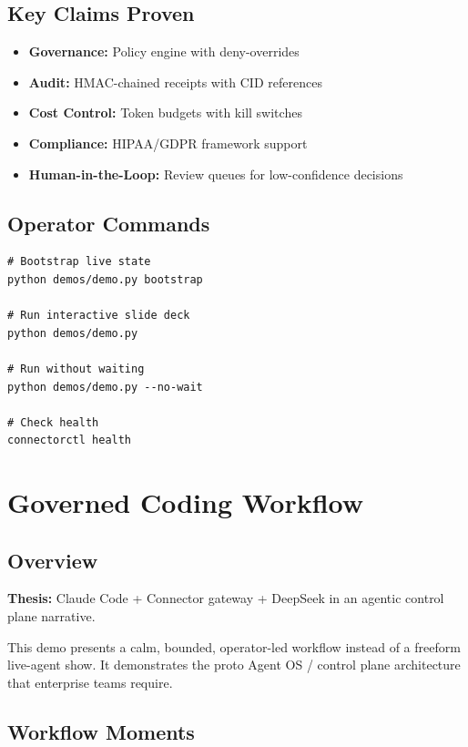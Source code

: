 \documentclass[11pt,a4paper]{article}
\begin{document}
\subsection{Key Claims Proven}

\begin{itemize}
    \item \textbf{Governance:} Policy engine with deny-overrides
    \item \textbf{Audit:} HMAC-chained receipts with CID references
    \item \textbf{Cost Control:} Token budgets with kill switches
    \item \textbf{Compliance:} HIPAA/GDPR framework support
    \item \textbf{Human-in-the-Loop:} Review queues for low-confidence decisions
\end{itemize}

\subsection{Operator Commands}

\begin{lstlisting}
# Bootstrap live state
python demos/demo.py bootstrap

# Run interactive slide deck
python demos/demo.py

# Run without waiting
python demos/demo.py --no-wait

# Check health
connectorctl health
\end{lstlisting}

\newpage

\section{Governed Coding Workflow}

\subsection{Overview}
\textbf{Thesis:} Claude Code + Connector gateway + DeepSeek in an agentic control plane narrative.

This demo presents a calm, bounded, operator-led workflow instead of a freeform live-agent show. It demonstrates the proto Agent OS / control plane architecture that enterprise teams require.

\subsection{Workflow Moments}
\end{document}
